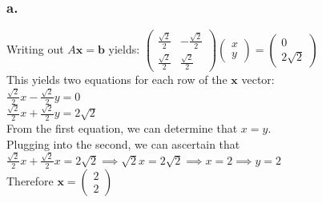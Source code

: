 \documentclass[fleqn]{article}
\begin{document}
\subsubsection*{a.}
Writing out $A\textbf{x}=\textbf{b}$ yields: $\begin{pmatrix}\frac{\sqrt{2}}{2} & -\frac{\sqrt{2}}{2}\\ \frac{\sqrt{2}}{2} & \frac{\sqrt{2}}{2}\end{pmatrix}\begin{pmatrix}x \\ y\end{pmatrix}=\begin{pmatrix}0 \\ 2\sqrt{2}\end{pmatrix}$\\
This yields two equations for each row of the $\textbf{x}$ vector:\\
$\frac{\sqrt{2}}{2}x -\frac{\sqrt{2}}{2}y=0$\\
$\frac{\sqrt{2}}{2}x +\frac{\sqrt{2}}{2}y=2\sqrt{2}$\\
\linebreak
From the first equation, we can determine that $x=y$.\\
Plugging into the second, we can ascertain that $\frac{\sqrt{2}}{2}x +\frac{\sqrt{2}}{2}x=2\sqrt{2}\implies\sqrt{2}x=2\sqrt{2}\implies x= 2 \implies y =2$\\
Therefore $\textbf{x}=\begin{pmatrix}2\\2\end{pmatrix}$
\end{document}
